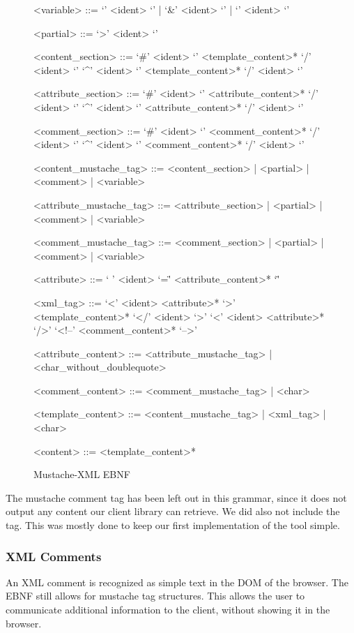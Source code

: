\documentclass[thesis.tex]{subfiles}
\begin{document}
\begin{figure}
	\centering
	\setlength{\grammarindent}{4.2cm}
	\begin{grammar}
<variable> ::= `{{{' <ident> `}}}' | `{{&' <ident> `}}' | `{{' <ident> `}}'

<partial> ::= `{{>' <ident> `}}'

<content\_section> ::= `{{#' <ident> `}}' <template\_content>* `{{/' <ident> `}}'
                  \alt `{{^' <ident> `}}' <template\_content>* `{{/' <ident> `}}'

<attribute\_section> ::= `{{#' <ident> `}}' <attribute\_content>* `{{/' <ident> `}}'
                    \alt `{{^' <ident> `}}' <attribute\_content>* `{{/' <ident> `}}'

<comment\_section> ::= `{{\#' <ident> `}}' <comment\_content>* `{{/' <ident> `}}'
                  \alt `{{^' <ident> `}}' <comment\_content>* `{{/' <ident> `}}'

<content\_mustache\_tag> ::= <content\_section> | <partial> | <comment> | <variable>

<attribute\_mustache\_tag> ::= <attribute\_section> | <partial> | <comment> | <variable>

<comment\_mustache\_tag> ::= <comment\_section> | <partial> | <comment> | <variable>

<attribute> ::= ` ' <ident> `=\"' <attribute\_content>* `\"' 

<xml\_tag> ::= `<' <ident> <attribute>* `>' <template\_content>* `</' <ident> `>'
          \alt `<' <ident> <attribute>* `/>'
          \alt `<!--' <comment\_content>* `-->'

<attribute\_content> ::= <attribute\_mustache\_tag> | <char\_without\_doublequote>

<comment\_content> ::= <comment\_mustache\_tag> | <char>

<template\_content> ::= <content\_mustache\_tag> | <xml\_tag> | <char>

<content> ::= <template\_content>*
	\end{grammar}
	\caption{Mustache-XML EBNF}
	\label{fig:mustache-xml.ebnf}
\end{figure}

The mustache comment tag has been left out in this grammar, since it does not
output any content our client library can retrieve. We did also not include the
 tag. This was mostly done to keep our first
implementation of the tool simple.

\subsubsection{XML Comments}
An XML comment is recognized as simple text in the DOM of the browser. The EBNF
still allows for mustache tag structures. This allows the user to communicate
additional information to the client, without showing it in the browser.
\end{document}
